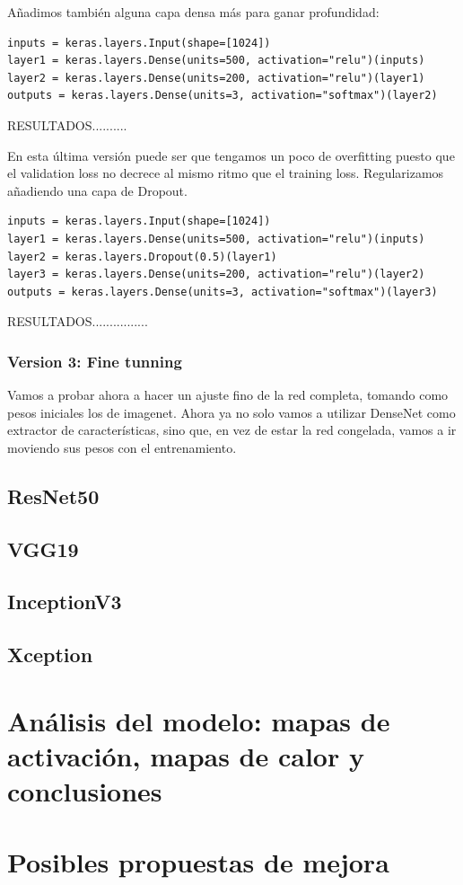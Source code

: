 \documentclass[11pt,a4paper]{article}
\theoremstyle{definition}
\begin{document}
Añadimos también alguna capa densa más para ganar profundidad:

\begin{lstlisting}
inputs = keras.layers.Input(shape=[1024])
layer1 = keras.layers.Dense(units=500, activation="relu")(inputs)
layer2 = keras.layers.Dense(units=200, activation="relu")(layer1)
outputs = keras.layers.Dense(units=3, activation="softmax")(layer2)
\end{lstlisting}


RESULTADOS..........


En esta última versión puede ser que tengamos un poco de overfitting puesto que el validation loss no decrece al mismo ritmo que el training loss. Regularizamos añadiendo una capa de Dropout.

\begin{lstlisting}
inputs = keras.layers.Input(shape=[1024])
layer1 = keras.layers.Dense(units=500, activation="relu")(inputs)
layer2 = keras.layers.Dropout(0.5)(layer1)
layer3 = keras.layers.Dense(units=200, activation="relu")(layer2)
outputs = keras.layers.Dense(units=3, activation="softmax")(layer3)
\end{lstlisting}

RESULTADOS................


\subsubsection{Version 3: Fine tunning}

Vamos a probar ahora a hacer un ajuste fino de la red completa, tomando como pesos iniciales los de imagenet. Ahora ya no solo vamos a utilizar DenseNet como extractor de características, sino que, en vez de estar la red congelada, vamos a ir moviendo sus pesos con el entrenamiento.

\subsection{ResNet50}

\subsection{VGG19}

\subsection{InceptionV3}

\subsection{Xception}


\section{Análisis del modelo: mapas de activación, mapas de calor y conclusiones}

\section{Posibles propuestas de mejora}
\end{document}
